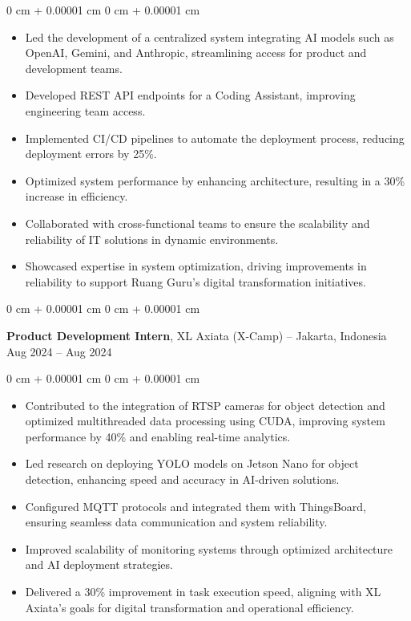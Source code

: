 \documentclass[10pt, a4paper]{article}
\newenvironment{highlights}{
    \begin{itemize}[
        topsep=0.10 cm,
        parsep=0.10 cm,
        partopsep=0pt,
        itemsep=0pt,
        leftmargin=0 cm + 10pt
    ]
}{
    \end{itemize}
} %
\newenvironment{onecolentry}{
    \begin{adjustwidth}{
        0 cm + 0.00001 cm
    }{
        0 cm + 0.00001 cm
    }
}{
    \end{adjustwidth}
} %
\newenvironment{twocolentry}[2][]{
    \onecolentry
    \def\secondColumn{#2}
    \setcolumnwidth{\fill, 4.5 cm}
    \begin{paracol}{2}
}{
    \switchcolumn \raggedleft \secondColumn
    \end{paracol}
    \endonecolentry
} %
\begin{document}
        \vspace{0.10 cm}
        \begin{onecolentry}
            \begin{highlights}
                \item Led the development of a centralized system integrating AI models such as OpenAI, Gemini, and Anthropic, streamlining access for product and development teams.
                \item Developed REST API endpoints for a Coding Assistant, improving engineering team access.
                \item Implemented CI/CD pipelines to automate the deployment process, reducing deployment errors by 25\%.
                \item Optimized system performance by enhancing architecture, resulting in a 30\% increase in efficiency.
                \item Collaborated with cross-functional teams to ensure the scalability and reliability of IT solutions in dynamic environments.
                \item Showcased expertise in system optimization, driving improvements in reliability to support Ruang Guru's digital transformation initiatives.
            \end{highlights}
        \end{onecolentry}


        \vspace{0.2 cm}

        \begin{twocolentry}{
            Aug 2024 – Aug 2024
        }
            \textbf{Product Development Intern}, XL Axiata (X-Camp) -- Jakarta, Indonesia\end{twocolentry}

        \vspace{0.10 cm}
        \begin{onecolentry}
            \begin{highlights}
                \item Contributed to the integration of RTSP cameras for object detection and optimized multithreaded data processing using CUDA, improving system performance by 40\% and enabling real-time analytics.
                \item Led research on deploying YOLO models on Jetson Nano for object detection, enhancing speed and accuracy in AI-driven solutions.
                \item Configured MQTT protocols and integrated them with ThingsBoard, ensuring seamless data communication and system reliability.
                \item Improved scalability of monitoring systems through optimized architecture and AI deployment strategies.
                \item Delivered a 30\% improvement in task execution speed, aligning with XL Axiata's goals for digital transformation and operational efficiency.
            \end{highlights}
        \end{onecolentry}
\end{document}

